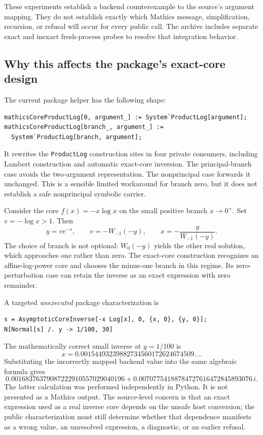 \documentclass[11pt,a4paper]{article}
\newcommand{\code}[1]{\texttt{#1}}
\begin{document}
These experiments establish a backend counterexample to the source's argument mapping. They do not establish exactly which Mathics message, simplification, recursion, or refusal will occur for every public call. The archive includes separate exact and inexact fresh-process probes to resolve that integration behavior.

\subsection{Why this affects the package's exact-core design}
The current package helper has the following shape:
\begin{lstlisting}[language=Wolfram]
mathicsCoreProductLog[0, argument_] := System`ProductLog[argument];
mathicsCoreProductLog[branch_, argument_] :=
  System`ProductLog[branch, argument];
\end{lstlisting}
It rewrites the \code{ProductLog} construction sites in four private consumers, including Lambert construction and automatic exact-core inversion. The principal-branch case avoids the two-argument representation. The nonprincipal case forwards it unchanged. This is a sensible limited workaround for branch zero, but it does not establish a safe nonprincipal symbolic carrier.\cite{corefunctions}

Consider the core $f(x)=-x\log x$ on the small positive branch $x\to0^+$. Set $v=-\log x>1$. Then
\begin{equation}
 y=v e^{-v},\qquad
 v=-W_{-1}(-y),\qquad
 x=-\frac{y}{W_{-1}(-y)}.
 \label{eq:entropyinverse}
\end{equation}
The choice of branch is not optional: $W_0(-y)$ yields the other real solution, which approaches one rather than zero. The exact-core construction recognizes an affine-log-power core and chooses the minus-one branch in this regime. Its zero-perturbation case can retain the inverse as an exact expression with zero remainder.\cite{coreperturb}

A targeted \emph{unexecuted} package characterization is
\begin{lstlisting}[language=Wolfram]
s = AsymptoticCoreInverse[-x Log[x], 0, {x, 0}, {y, 0}];
N[Normal[s] /. y -> 1/100, 30]
\end{lstlisting}
The mathematically correct small inverse at $y=1/100$ is
\begin{equation}
 x=0.00154493239882734560172624674509\ldots.
\end{equation}
Substituting the incorrectly mapped backend value into the same algebraic formula gives
\begin{equation}
 0.00168376379087222910557029040196
 +0.00707754188784727616472845893076\,i.
\end{equation}
The latter calculation was performed independently in Python. It is not presented as a Mathics output. The source-level concern is that an exact expression used as a real inverse core depends on the unsafe host conversion; the public characterization must still determine whether that dependence manifests as a wrong value, an unresolved expression, a diagnostic, or an earlier refusal.
\end{document}
